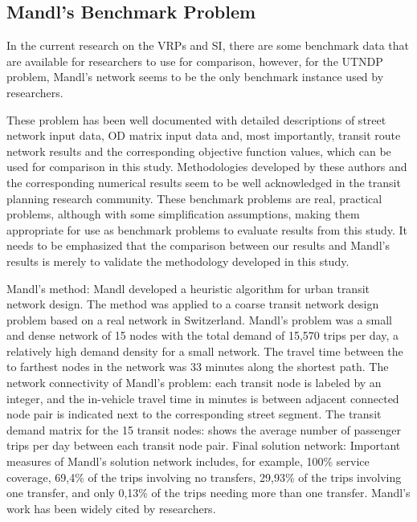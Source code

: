 \subsection{Mandl's Benchmark Problem}

In the current research on the VRPs and SI, there are some benchmark data that are available for researchers to use for comparison, however, for the UTNDP problem, Mandl's network seems to be the only benchmark instance used by researchers.  

These problem has been well documented with detailed descriptions of street network input data, OD matrix input data and, most importantly, transit route network results and the corresponding objective function values, which can be used for comparison in this study. Methodologies developed by these authors and the corresponding numerical results seem to be well acknowledged in the transit planning research community. These benchmark problems are real, practical problems, although with some simplification assumptions, making them appropriate for use as benchmark problems to evaluate results from this study. It needs to be emphasized that the comparison between our results and Mandl's results is merely to validate the methodology developed in this study. 

Mandl's method:
Mandl developed a heuristic algorithm for urban transit network design. The method was applied to a coarse transit network design problem based on a real network in Switzerland. Mandl's problem was a small and dense network of 15 nodes with the total demand of 15,570 trips per day, a relatively high demand density for a small network. The travel time between the to farthest nodes in the network was 33 minutes along the shortest path. The network connectivity of Mandl's problem: each transit node is labeled by an integer, and the in-vehicle travel time in minutes is between adjacent connected node pair is indicated next to the corresponding street segment. The transit demand matrix for the 15 transit nodes: shows the average number of passenger trips per day between each transit node pair. Final solution network: Important measures of Mandl's solution network includes, for example, 100\% service coverage, 69,4\% of the trips involving no transfers, 29,93\% of the trips involving one transfer, and only 0,13\% of the trips needing more than one transfer. Mandl's work has been widely cited by researchers. 

